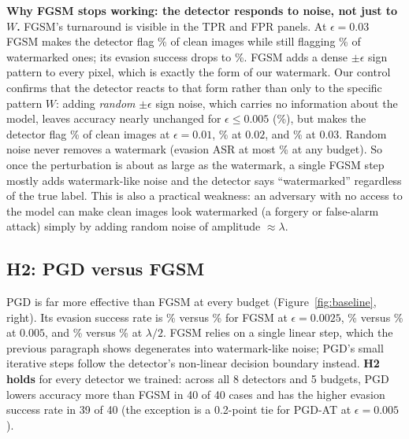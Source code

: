 \documentclass[sigconf, nonacm]{acmart}
\begin{document}
\textbf{Why FGSM stops working: the detector responds to noise, not just to $W$.} FGSM's
turnaround is visible in the TPR and FPR panels. At $\epsilon=0.03$ FGSM makes the detector flag
\BaseFgsmFprE\% of clean images while still flagging \BaseFgsmTprE\% of watermarked ones; its
evasion success drops to \BaseFgsmAsrE\%. FGSM adds a dense $\pm\epsilon$ sign pattern to every
pixel, which is exactly the form of our watermark. Our control confirms that the detector reacts to
that form rather than only to the specific pattern $W$: adding \emph{random} $\pm\epsilon$ sign
noise, which carries no information about the model, leaves accuracy nearly unchanged for
$\epsilon\le0.005$ (\BaseNoiseAccB\%), but makes the detector flag \BaseNoiseFprC\% of clean images
at $\epsilon=0.01$, \BaseNoiseFprD\% at $0.02$, and \BaseNoiseFprE\% at $0.03$. Random noise never
removes a watermark (evasion ASR at most \BaseNoiseAsrB\% at any budget). So once the perturbation is about as
large as the watermark, a single FGSM step mostly adds watermark-like noise and the detector says
``watermarked'' regardless of the true label. This is also a practical weakness: an adversary with
no access to the model can make clean images look watermarked (a forgery or false-alarm attack)
simply by adding random noise of amplitude $\approx\lambda$.

\subsection{H2: PGD versus FGSM}
PGD is far more effective than FGSM at every budget (Figure~\ref{fig:baseline}, right). Its
evasion success rate is \BasePgdAsrA\% versus \BaseFgsmAsrA\% for FGSM at $\epsilon=0.0025$,
\BasePgdAsrB\% versus \BaseFgsmAsrB\% at $0.005$, and \BasePgdAsrC\% versus \BaseFgsmAsrC\% at
$\lambda/2$. FGSM relies on a single linear step, which the previous paragraph shows degenerates
into watermark-like noise; PGD's small iterative steps follow the detector's non-linear decision
boundary instead. \textbf{H2 holds} for every detector we trained: across all 8 detectors and 5
budgets, PGD lowers accuracy more than FGSM in 40 of 40 cases and has the higher evasion success
rate in 39 of 40 (the exception is a 0.2-point tie for PGD-AT at $\epsilon=0.005$).
\end{document}
